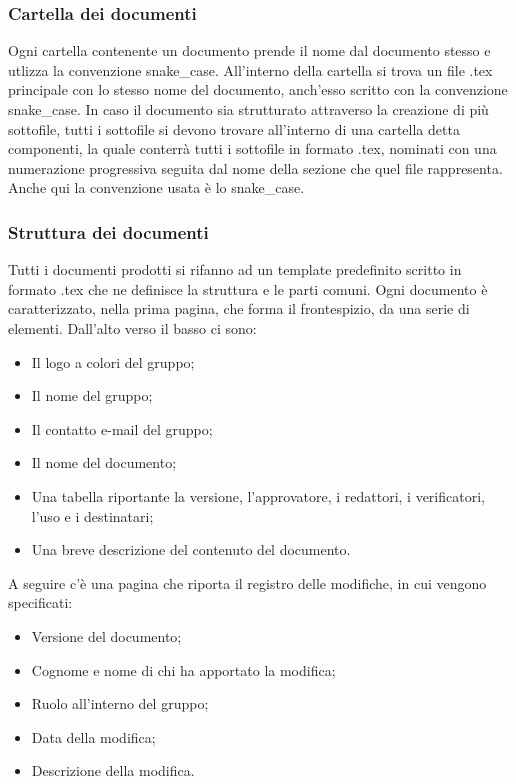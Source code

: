 \documentclass[../norme_di_progetto.tex]{subfiles}
\begin{document}
\subsubsection{Cartella dei documenti}
Ogni cartella contenente un documento prende il nome dal documento stesso e utlizza la convenzione snake\_case. All'interno della cartella si trova un file .tex principale con lo stesso nome del documento, anch'esso scritto con la convenzione snake\_case. In caso il documento sia strutturato attraverso la creazione di più sottofile, tutti i sottofile si devono trovare all'interno di una cartella detta componenti, la quale conterrà tutti i sottofile in formato .tex, nominati con una numerazione progressiva seguita dal nome della sezione che quel file rappresenta. Anche qui la convenzione usata è lo snake\_case.

\subsubsection{Struttura dei documenti}
Tutti i documenti prodotti si rifanno ad un template predefinito scritto in formato .tex che ne definisce la struttura e le parti comuni. Ogni documento è caratterizzato, nella prima pagina, che forma il frontespizio, da una serie di elementi. Dall'alto verso il basso ci sono:
\begin{itemize}
    \item Il logo a colori del gruppo;
    \item Il nome del gruppo;
    \item Il contatto e-mail del gruppo;
    \item Il nome del documento;
    \item Una tabella riportante la versione, l'approvatore, i redattori, i verificatori, l'uso e i destinatari;
    \item Una breve descrizione del contenuto del documento.
\end{itemize}
A seguire c'è una pagina che riporta il registro delle modifiche, in cui vengono specificati:
\begin{itemize}
    \item Versione del documento;
    \item Cognome e nome di chi ha apportato la modifica;
    \item Ruolo all'interno del gruppo;
    \item Data della modifica;
    \item Descrizione della modifica.
\end{itemize}
\end{document}
